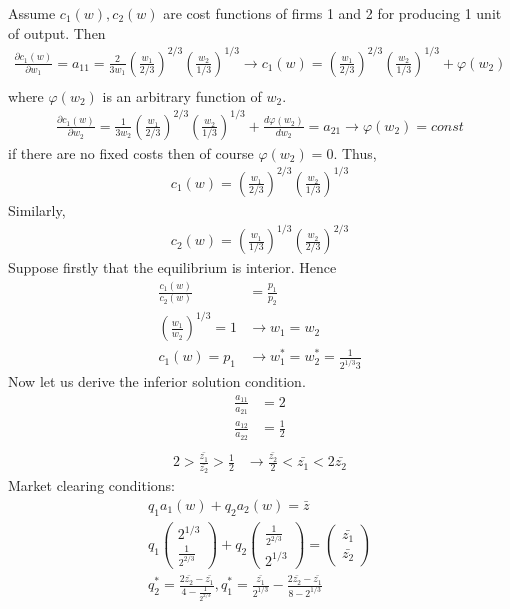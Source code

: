 \documentclass[a4paper]{article}
\begin{document}
Assume $c_1(w), c_2(w)$ are cost functions of firms 1 and 2 for producing 1 unit of output. Then
\begin{align*}
\frac{\partial c_1(w)}{\partial w_1} = a_{11} = \frac{2}{3w_1}\left(\frac{w_1}{2/3}\right)^{2/3}\left(\frac{w_2}{1/3}\right)^{1/3} \to c_1(w) =\left(\frac{w_1}{2/3}\right)^{2/3}\left(\frac{w_2}{1/3}\right)^{1/3} + \varphi(w_2)\\
\end{align*}
where $\varphi(w_2)$ is an arbitrary function of $w_2$.
\begin{align*}
\frac{\partial c_1(w)}{\partial w_2} = \frac{1}{3w_2}\left(\frac{w_1}{2/3}\right)^{2/3}\left(\frac{w_2}{1/3}\right)^{1/3} + \frac{d\varphi(w_2)}{dw_2} = a_{21} \to \varphi(w_2) = const
\end{align*}
if there are no fixed costs then of course $\varphi(w_2) = 0$. Thus, 
\begin{align*}
c_1(w) = \left(\frac{w_1}{2/3}\right)^{2/3}\left(\frac{w_2}{1/3}\right)^{1/3}
\end{align*}
Similarly, 
\begin{align*}
c_2(w) = \left(\frac{w_1}{1/3}\right)^{1/3}\left(\frac{w_2}{2/3}\right)^{2/3}
\end{align*}
Suppose firstly that the equilibrium is interior. Hence
\begin{align*}
\frac{c_1(w)}{c_2(w)} &= \frac{p_1}{p_2}\\
\left(\frac{w_1}{w_2}\right)^{1/3} = 1 &\to w_1 = w_2\\
c_1(w) = p_1 &\to w_1^* = w_2^* = \frac{1}{2^{1/3}3}
\end{align*}
Now let us derive the inferior solution condition.
\begin{align*}
\frac{a_{11}}{a_{21}} &= 2\\
\frac{a_{12}}{a_{22}} &= \frac{1}{2}\\
\end{align*}
\begin{align}\label{eq1}
2 > \frac{\bar{z_1}}{\bar{z_2}} > \frac{1}{2} &\to \frac{\bar{z_2}}{2} < \bar{z_1} < 2\bar{z_2}
\end{align}
Market clearing conditions:
\begin{align*}
q_1 a_1(w) + q_2 a_2(w) = \bar{z}\\
q_1 \begin{pmatrix}
2^{1/3}\\
\frac{1}{2^{2/3}}
\end{pmatrix} + q_2 \begin{pmatrix}
\frac{1}{2^{2/3}}\\
2^{1/3}
\end{pmatrix} = \begin{pmatrix}
\bar{z_1}\\
\bar{z_2}
\end{pmatrix}\\
q_2^* = \frac{2\bar{z_2} - \bar{z_1}}{4 - \frac{1}{2^{2/3}}}, q_1^* = \frac{\bar{z_1}}{2^{1/3}} - \frac{2\bar{z_2} - \bar{z_1}}{8 - 2^{1/3}}
\end{align*}
\end{document}
